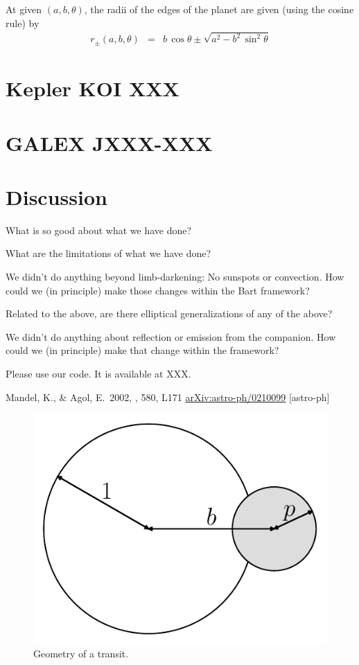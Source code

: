 \documentclass[12pt,preprint]{aastex}
\newcommand{\project}[1]{{\sffamily #1}}
\newcommand{\figlabel}[1]{\label{fig:#1}}
\begin{document}
At given $(a, b, \theta)$, the radii of the edges of the planet are given
(using the cosine rule) by
\begin{eqnarray}
    r_\pm (a, b, \theta) & = & b \, \cos \theta \pm \sqrt{a^2 -
        b^2\,\sin^2\theta}
\end{eqnarray}

\section{Kepler KOI XXX}

\section{GALEX JXXX-XXX}

\section{Discussion}

What is so good about what we have done?

What are the limitations of what we have done?

We didn't do anything beyond limb-darkening:  No sunspots or convection.
How could we (in principle) make those changes within the \project{Bart} framework?

Related to the above, are there elliptical generalizations of any of the above?

We didn't do anything about reflection or emission from the companion.
How could we (in principle) make that change within the framework?

Please use our code.  It is available at XXX.

\acknowledgments

\newcommand{\arxiv}[1]{\href{http://arxiv.org/abs/#1}{arXiv:#1}}
\begin{thebibliography}{}\raggedright

        Mandel, K., \& Agol, E.\ 2002, \apjl, 580, L171
        \arxiv{astro-ph/0210099} [astro-ph]

\end{thebibliography}


\clearpage

\begin{figure}[htbp]
    \begin{center}
        \includegraphics[width=\textwidth]{figures/geom.pdf}
    \end{center}
    \caption{Geometry of a transit. \figlabel{geom}}
\end{figure}
\end{document}
